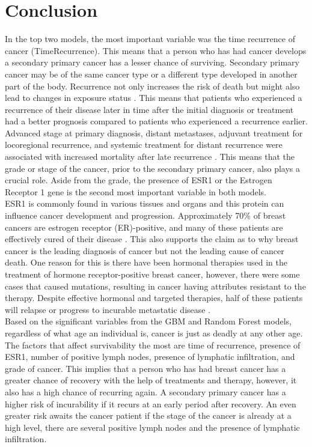 \documentclass[11pt,singlespace]{article}
\begin{document}
	\section{Conclusion}
	In the top two models, the most important variable was the time recurrence of cancer (TimeRecurrence). This means that a person who has had cancer develops a secondary primary cancer has a lesser chance of surviving. Secondary primary cancer may be of the same cancer type or a different type developed in another part of the body. Recurrence not only increases the risk of death but might also lead to changes in exposure status \cite{Cancer Recurrence}. This means that patients who experienced a recurrence of their disease later in time after the initial diagnosis or treatment had a better prognosis compared to patients who experienced a recurrence earlier. Advanced stage at primary diagnosis, distant metastases, adjuvant treatment for locoregional recurrence, and systemic treatment for distant recurrence were associated with increased mortality after late recurrence \cite{Mortality Rate}. This means that the grade or stage of the cancer, prior to the secondary primary cancer, also plays a crucial role. Aside from the grade, the presence of ESR1 or the Estrogen Receptor 1 gene is the second most important variable in both models. 
	\\
	
	ESR1 is commonly found in various tissues and organs and this protein can influence cancer development and progression. Approximately 70\% of breast cancers are estrogen receptor (ER)-positive, and many of these patients are effectively cured of their disease \cite{ESR1 Mutation in Breast Cancer}. This also supports the claim as to why breast cancer is the leading diagnosis of cancer but not the leading cause of cancer death. One reason for this is there have been hormonal therapies used in the treatment of hormone receptor-positive breast cancer, however, there were some cases that caused mutations, resulting in cancer having attributes resistant to the therapy. Despite effective hormonal and targeted therapies, half of these patients will relapse or progress to incurable metastatic disease \cite{ESR1 Mutation in Breast Cancer}.	
	\\
	
	Based on the significant variables from the GBM and Random Forest models, regardless of what age an individual is, cancer is just as deadly at any other age. The factors that affect survivability the most are time of recurrence, presence of ESR1, number of positive lymph nodes, presence of lymphatic infiltration, and grade of cancer. This implies that a person who has had breast cancer has a greater chance of recovery with the help of treatments and therapy, however, it also has a high chance of recurring again. A secondary primary cancer has a higher risk of incurability if it recurs at an early period after recovery. An even greater risk awaits the cancer patient if the stage of the cancer is already at a high level, there are several positive lymph nodes and the presence of lymphatic infiltration.
	\\
	
\end{document}
